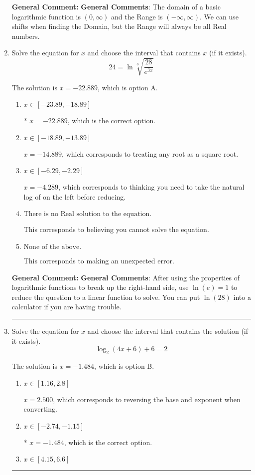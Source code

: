 \documentclass{extbook}[14pt]
\newcommand{\litem}[1]{\item #1

\rule{\textwidth}{0.4pt}}
\begin{document}
\begin{enumerate}
{\textbf{General Comment:} \textbf{General Comments}: The domain of a basic logarithmic function is $(0, \infty)$ and the Range is $(-\infty, \infty)$. We can use shifts when finding the Domain, but the Range will always be all Real numbers.
}
\litem{
 Solve the equation for $x$ and choose the interval that contains $x$ (if it exists).
\[  24 = \ln{\sqrt[3]{\frac{28}{e^{3x}}}} \]

The solution is \( x = -22.889 \), which is option A.\begin{enumerate}[label=\Alph*.]
\item \( x \in [-23.89, -18.89] \)

* $x = -22.889$, which is the correct option.
\item \( x \in [-18.89, -13.89] \)

$x = -14.889$, which corresponds to treating any root as a square root.
\item \( x \in [-6.29, -2.29] \)

$x = -4.289$, which corresponds to thinking you need to take the natural log of on the left before reducing.
\item \( \text{There is no Real solution to the equation.} \)

This corresponds to believing you cannot solve the equation.
\item \( \text{None of the above.} \)

This corresponds to making an unexpected error.
\end{enumerate}

\textbf{General Comment:} \textbf{General Comments}: After using the properties of logarithmic functions to break up the right-hand side, use $\ln(e) = 1$ to reduce the question to a linear function to solve. You can put $\ln(28)$ into a calculator if you are having trouble.
}
\litem{
Solve the equation for $x$ and choose the interval that contains the solution (if it exists).
\[ \log_{2}{(4x+6)}+6 = 2 \]

The solution is \( x = -1.484 \), which is option B.\begin{enumerate}[label=\Alph*.]
\item \( x \in [1.16, 2.8] \)

$x = 2.500$, which corresponds to reversing the base and exponent when converting.
\item \( x \in [-2.74, -1.15] \)

* $x = -1.484$, which is the correct option.
\item \( x \in [4.15, 6.6] \)


\end{enumerate}}
\end{enumerate}
\end{document}
